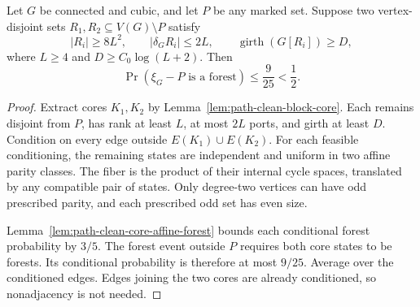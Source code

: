\begin{proposition}
\label{prop:path-two-clean-blocks}
Let $G$ be connected and cubic, and let $P$ be any marked set.
Suppose two vertex-disjoint sets $R_1,R_2\subseteq V(G)\setminus P$ satisfy
\[
 |R_i|\ge8L^2,\qquad |\delta_G R_i|\le2L,
 \qquad\operatorname{girth}(G[R_i])\ge D,
\]
where $L\ge4$ and $D\ge C_0\log(L+2)$.
Then
\[
 \Pr(\xi_G-P\text{ is a forest})\le\frac9{25}<\frac12.
\]
\end{proposition}

\begin{proof}
Extract cores $K_1,K_2$ by Lemma~\ref{lem:path-clean-block-core}.
Each remains disjoint from $P$, has rank at least $L$, at most $2L$ ports, and girth at least $D$.
Condition on every edge outside $E(K_1)\cup E(K_2)$.
For each feasible conditioning, the remaining states are independent and uniform in two affine parity classes.
The fiber is the product of their internal cycle spaces, translated by any compatible pair of states.
Only degree-two vertices can have odd prescribed parity, and each prescribed odd set has even size.

Lemma~\ref{lem:path-clean-core-affine-forest} bounds each conditional forest probability by $3/5$.
The forest event outside $P$ requires both core states to be forests.
Its conditional probability is therefore at most $9/25$.
Average over the conditioned edges.
Edges joining the two cores are already conditioned, so nonadjacency is not needed.
\end{proof}
